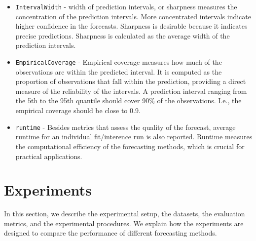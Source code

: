 \begin{itemize}
    \item \texttt{IntervalWidth} - width of prediction intervals, or sharpness measures the concentration of the prediction intervals. More concentrated intervals indicate higher confidence in the forecasts. Sharpness is desirable because it indicates precise predictions. Sharpness is calculated as the average width of the prediction intervals.
    \item \texttt{EmpiricalCoverage} - Empirical coverage measures how much of the observations are within the predicted interval. It is computed as the proportion of observations that fall within the prediction, providing a direct measure of the reliability of the intervals. A prediction interval ranging from the 5th to the 95th quantile should cover 90\% of the observations. I.e., the empirical coverage should be close to 0.9.
    \item \texttt{runtime} - Besides metrics that assess the quality of the forecast, average runtime for an individual fit/interence run is also reported. Runtime measures the computational efficiency of the forecasting methods, which is crucial for practical applications.
 
\end{itemize}



\section{Experiments} \label{experiments}
In this section, we describe the experimental setup, the datasets, the evaluation metrics, and the experimental procedures. We explain how the experiments are designed to compare the performance of different forecasting methods.



